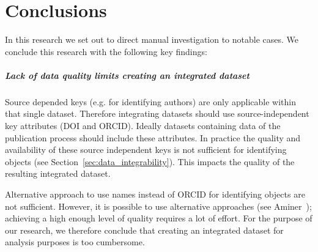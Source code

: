 \documentclass{ou-report}
\newcommand{\doi}{{DOI}}
\newcommand{\orcid}{ORCID}
\begin{document}


\chapter{Conclusions}
\label{chp:conclusions}

In this research we set out to direct manual investigation to notable cases.
We conclude this research with the following key findings:

\paragraph{Lack of data quality limits creating an integrated dataset}
Source depended keys (e.g. for identifying authors) are only applicable within 
that single dataset. Therefore integrating datasets should use 
source-independent key attributes (\doi{} and \orcid{}). Ideally datasets 
containing data of the publication process should include these attributes. In 
practice the quality and availability of these source independent keys is not 
sufficient for identifying objects (see Section~\ref{sec:data_integrability}). 
This impacts the quality of the resulting integrated dataset.

Alternative approach to use names instead of \orcid{} for identifying objects are 
not sufficient. However, it is possible to use alternative approaches 
(see Aminer~\cite{Tang:08KDD}); achieving a high enough level of quality 
requires a lot of effort. For the purpose of our research, we therefore conclude 
that creating an integrated dataset for analysis purposes is too cumbersome.
\end{document}
